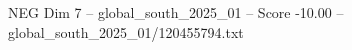 \begin{textsample}{NEG Dim 7 – global\_south\_2025\_01 – Score -10.00 – global\_south\_2025\_01/120455794.txt}
\end{textsample}
